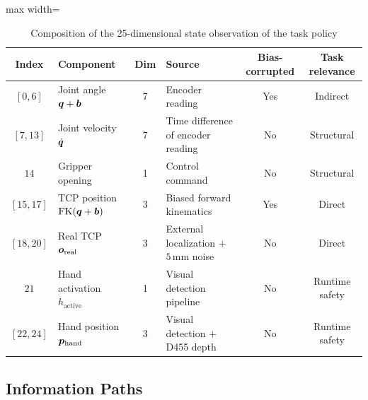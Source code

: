 \begin{table}[htbp]
  \centering
  \caption{Composition of the 25-dimensional state observation of the task policy}
  \label{tab:obs_25d}
  \small
  \begin{adjustbox}{max width=\textwidth}
  \begin{tabular}{@{}clclcc@{}}
    \toprule
    Index & Component & Dim & Source & Bias-corrupted & Task relevance \\
    \midrule
    $[0, 6]$   & Joint angle $\bm{q}+\bm{b}$ & 7 & Encoder reading & Yes & Indirect \\
    $[7, 13]$  & Joint velocity $\dot{\bm{q}}$ & 7 & Time difference of encoder reading & No & Structural \\
    $14$       & Gripper opening & 1 & Control command & No & Structural \\
    $[15, 17]$ & TCP position $\text{FK}(\bm{q}+\bm{b})$ & 3 & Biased forward kinematics & Yes & Direct \\
    $[18, 20]$ & Real TCP $\bm{o}_\text{real}$ & 3 & External localization $+$ $5$\,mm noise & No & Direct \\
    $21$       & Hand activation $h_\text{active}$ & 1 & Visual detection pipeline & No & Runtime safety \\
    $[22, 24]$ & Hand position $\bm{p}_\text{hand}$ & 3 & Visual detection $+$ D455 depth & No & Runtime safety \\
    \bottomrule
  \end{tabular}
  \end{adjustbox}
\end{table}

\subsection{Information Paths}\label{subsec:obs_dataflow}

